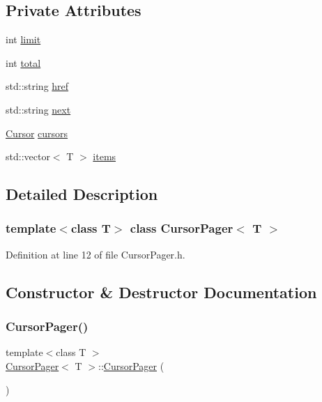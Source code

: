 \subsection*{Private Attributes}
\begin{DoxyCompactItemize}
\item 
int \mbox{\hyperlink{class_cursor_pager_aeb9a63e4c2d54f64c00fd95d02efc2f7}{limit}}
\item 
int \mbox{\hyperlink{class_cursor_pager_aae1bd2df9e1844beca1d12a590707fc3}{total}}
\item 
std\+::string \mbox{\hyperlink{class_cursor_pager_a0899805bbf2a0e7a1db0dce4eec79a11}{href}}
\item 
std\+::string \mbox{\hyperlink{class_cursor_pager_acc143185d46973f2733af18409c22ce8}{next}}
\item 
\mbox{\hyperlink{class_cursor}{Cursor}} \mbox{\hyperlink{class_cursor_pager_af7befd1981dba1c4da319b8fd40de6ed}{cursors}}
\item 
std\+::vector$<$ T $>$ \mbox{\hyperlink{class_cursor_pager_a086865ec09d59948bd89220d974023d3}{items}}
\end{DoxyCompactItemize}


\subsection{Detailed Description}
\subsubsection*{template$<$class T$>$\newline
class Cursor\+Pager$<$ T $>$}



Definition at line 12 of file Cursor\+Pager.\+h.



\subsection{Constructor \& Destructor Documentation}
\mbox{\label{class_cursor_pager_adb9af7ade4c6f7cc47f6176e6c3c8d3c}} 
\subsubsection{\texorpdfstring{Cursor\+Pager()}{CursorPager()}\hspace{0.1cm}{\footnotesize\ttfamily [1/2]}}
{\footnotesize\ttfamily template$<$class T $>$ \\
\mbox{\hyperlink{class_cursor_pager}{Cursor\+Pager}}$<$ T $>$\+::\mbox{\hyperlink{class_cursor_pager}{Cursor\+Pager}} (\begin{DoxyParamCaption}{ }\end{DoxyParamCaption})\hspace{0.3cm}{\ttfamily [default]}}

